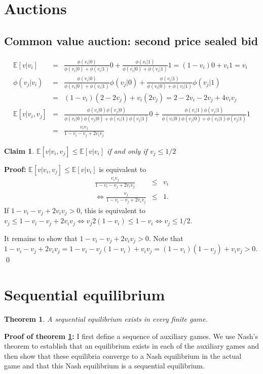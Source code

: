 \documentclass[a4paper,11pt]{article}
\newtheorem{theorem}{Theorem}
\newtheorem{claim}{Claim}
\begin{document}
\section{Auctions}
\label{sec:auctions}

\subsection{Common value auction: second price sealed bid}
\label{sec:comm-value-auct}

\begin{eqnarray*}
\mathbb{E}[v|v_i]&=&\frac{\phi(v_i|0)}{\phi(v_i|0)+\phi(v_i|1)}0+\frac{\phi(v_i|1)}{\phi(v_i|0)+\phi(v_i|1)}1=(1-v_i)0+v_i1=v_i\\
 \phi(v_j|v_i)&=&\frac{\phi(v_i|0)}{\phi(v_i|0)+\phi(v_i|1)}\phi(v_j|0)+\frac{\phi(v_i|1)}{\phi(v_i|0)+\phi(v_i|1)}\phi(v_j|1)\\ &=&(1-v_i)(2-2v_j)+v_i(2v_j) =2-2v_i-2v_j+4v_iv_j\\
\mathbb{E}[v|v_i,v_j]&=&\frac{\phi(v_i|0)\phi(v_j|0)}{\phi(v_i|0)\phi(v_j|0)+\phi(v_i|1)\phi(v_j|1)}0+\frac{\phi(v_i|1)\phi(v_j|1)}{\phi(v_i|0)\phi(v_j|0)+\phi(v_i|1)\phi(v_j|1)}1\\ &=&\frac{v_iv_j}{1-v_i-v_j+2v_iv_j}
\end{eqnarray*}

\begin{claim}
  $\mathbb{E}[v|v_i,v_j]\leq\mathbb{E}[v|v_i]$ if and only if $v_j\leq 1/2$ 
\end{claim}
\textbf{Proof: }$\mathbb{E}[v|v_i,v_j]\leq\mathbb{E}[v|v_i]$ is equivalent to
\begin{eqnarray*}
  \frac{v_iv_j}{1-v_i-v_j+2v_iv_j}&\leq& v_i\\
  \Leftrightarrow \frac{v_j}{1-v_i-v_j+2v_iv_j}&\leq& 1.
\end{eqnarray*}
If $1-v_i-v_j+2v_iv_j>0$, this is equivalent to $v_j\leq1-v_i-v_j+2v_iv_j\Leftrightarrow v_j2 (1-v_i)\leq 1-v_i\Leftrightarrow v_j\leq 1/2$.

It remains to show that $1-v_i-v_j+2v_iv_j>0$. Note that $1-v_i-v_j+2v_iv_j=1-v_i-v_j(1-v_i)+v_iv_j=(1-v_i)(1-v_j)+v_iv_j>0$.
\qed


\section{Sequential equilibrium}
\label{sec:sequ-equil}

\begin{theorem}\label{thm:seqEqExistence}
A sequential equilibrium exists in every finite game.
\end{theorem}
\textbf{Proof of theorem \ref{thm:seqEqExistence}: }I first define a sequence of auxiliary games. We use Nash's theorem to establish that an equilibrium exists in each of the auxiliary games and then show that these equilibria converge to a Nash equilibrium in the actual game and that this Nash equilibrium is a sequential equilibrium.
\end{document}
